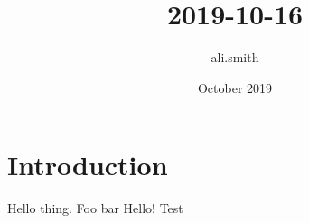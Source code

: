 \documentclass{article}
\title{2019-10-16}
\author{ali.smith }
\date{October 2019}
\begin{document}
\maketitle

\section{Introduction}
Hello thing. Foo bar Hello! Test
\end{document}
